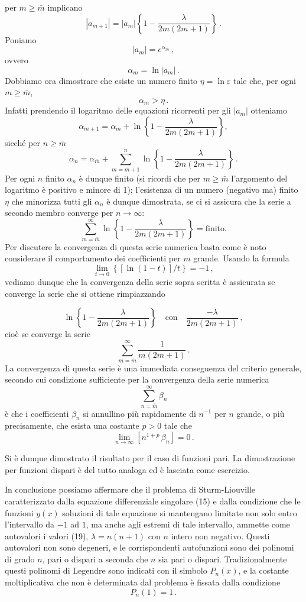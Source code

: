 \documentclass[11pt, a4paper]{book}
\numberwithin{equation}{section}
\begin{document}
per $m \geq \bar{m}$ implicano
\[
|a_{m+1}| = |a_m| \left\{ 1 - \frac{\lambda}{2m(2m+1)} \right\} \,.
\]
Poniamo
\[
|a_m| = e^{\alpha_m} \,,
\]
ovvero
\[
\alpha_m = \ln |a_m| \,.
\]
Dobbiamo ora dimostrare che esiste un numero finito $\eta = \ln \varepsilon$
tale che, per ogni $m \geq \bar{m}$,
\[
\alpha_m > \eta \,.
\]
Infatti prendendo il logaritmo delle equazioni ricorrenti per gli $|a_m|$ otteniamo
\[
\alpha_{m+1} = \alpha_m + \ln\left\{ 1 - \frac{\lambda}{2m(2m+1)} \right\},
\]
sicché per $n \geq \bar{m}$
\[
\alpha_n = \alpha_{\bar{m}} + \sum_{m=\bar{m}+1}^{n} \ln\left\{ 1 - \frac{\lambda}{2m(2m+1)} \right\} \,.
\]
Per ogni $n$ finito $\alpha_n$ è dunque finito (si ricordi che per $m \geq \bar{m}$
l'argomento del logaritmo è positivo e minore di 1); l'esistenza di un
numero (negativo ma) finito $\eta$ che minorizza tutti gli $\alpha_n$ è dunque
dimostrata, se ci si assicura che la serie a secondo membro converge per
$n \to \infty$:
\[
\sum_{m=\bar{m}}^{\infty} \ln\left\{ 1 - \frac{\lambda}{2m(2m+1)} \right\} = \text{finito.}
\]
Per discutere la convergenza di questa serie numerica basta come è
noto considerare il comportamento dei coefficienti per $m$ grande. Usando
la formula
\[
\lim_{t \to 0} \left\{ \left[\ln(1-t)\right] / t \right\} = -1 \,,
\]
vediamo dunque che la convergenza della serie sopra scritta è assicurata
se converge la serie che si ottiene rimpiazzando %


\[
\ln\left\{ 1 - \frac{\lambda}{2m(2m+1)} \right\} \quad \text{con} \quad \frac{-\lambda}{2m(2m+1)} \,,
\]
cioè se converge la serie
\[
\sum_{m=\bar{m}}^{\infty} \frac{1}{m(2m+1)} \,.
\]
La convergenza di questa serie è una immediata conseguenza del criterio
generale, secondo cui condizione sufficiente per la convergenza della serie numerica
\[
\sum_{n=\bar{m}}^{\infty} \beta_n
\]
è che i coefficienti $\beta_n$ si annullino più rapidamente di $n^{-1}$ per $n$
grande, o più precisamente, che esista una costante $p > 0$ tale che
\[
\lim_{n \to \infty} \left[ n^{1+p}\, \beta_n \right] = 0 \,.
\]

Si è dunque dimostrato il risultato per il caso di funzioni pari.
La dimostrazione per funzioni dispari è del tutto analoga ed è lasciata
come esercizio.

In conclusione possiamo affermare che il problema di Sturm-Liouville caratterizzato dalla equazione differenziale singolare (15) e dalla condizione che le funzioni $y(x)$ soluzioni di tale equazione si mantengano limitate non solo entro l'intervallo da $-1$ ad $1$, ma anche agli estremi di tale intervallo, ammette come autovalori i valori (19), $\lambda = n(n+1)$ con $n$ intero non negativo. Questi autovalori non sono degeneri, e le corrispondenti autofunzioni sono dei polinomi di grado $n$, pari o dispari a seconda che $n$ sia pari o dispari. Tradizionalmente questi polinomi di Legendre sono indicati con il simbolo $P_n(x)$, e la costante moltiplicativa che non è determinata dal problema è fissata dalla condizione
\begin{equation}
P_n(1) = 1 \,. \tag{20}
\end{equation}
\end{document}
